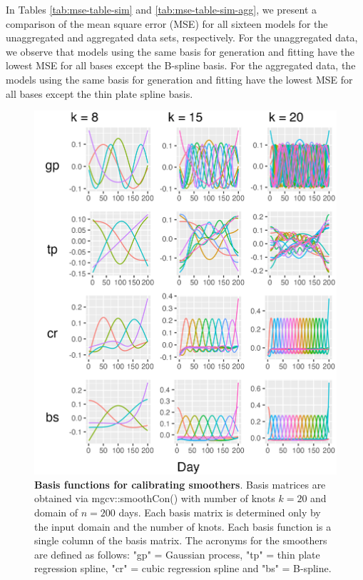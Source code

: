 \documentclass[
11pt, %
oneside, %
english, %
singlespacing, %
]{macthesis} %
\begin{document}
In Tables \ref{tab:mse-table-sim} and \ref{tab:mse-table-sim-agg}, we present a comparison of the mean square error (MSE) for all sixteen models for the unaggregated and aggregated data sets, respectively. For the unaggregated data, we observe that models using the same basis for generation and fitting have the lowest MSE for all bases except the B-spline basis. For the aggregated data, the models using the same basis for generation and fitting have the lowest MSE for all bases except the thin plate spline basis.

\begin{figure}[H]
\centering
\includegraphics[width=\textwidth]{figure/Simulated/unaggregated/simulation_gp_20_k(5,10,20)_bsd1_beta1_plot_basis.png}
\caption[Basis Functions for Smoothing Basis.]{\textbf{Basis functions for calibrating smoothers}. Basis matrices are obtained via mgcv::smoothCon() with number of knots \(k=20\) and domain of \(n=200\) days. Each basis matrix is determined only by the input domain and the number of knots. Each basis function is a single column of the basis matrix. The acronyms for the smoothers are defined as follows: "gp" = Gaussian process, "tp" = thin plate regression spline, "cr" = cubic regression spline and "bs" = B-spline.}
\label{fig:sim_basis}
\end{figure}
\end{document}
